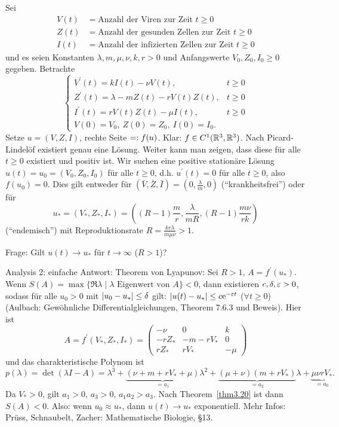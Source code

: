 \documentclass[a4paper,twoside,DIV15,BCOR12mm]{scrbook}
\begin{document}
\begin{bsp} \label{bsp3.21}
  Sei
  \begin{align*}
    V(t) &= \text{Anzahl der Viren zur Zeit } t\ge0\\
    Z(t) &= \text{Anzahl der gesunden Zellen zur Zeit } t\ge0\\
    I(t) &= \text{Anzahl der infizierten Zellen zur Zeit } t\ge0
  \end{align*}
  und es seien Konstanten $\lambda,m,\mu,\nu,k,r>0$ und Anfangswerte $V_0,Z_0,I_0\ge0$ gegeben. Betrachte
  \[ \begin{cases}
    V^\prime(t) = kI(t)-\nu V(t), &t\ge0\\
    Z^\prime(t) = \lambda - mZ(t) - rV(t)Z(t), &t\ge0\\
    I^\prime(t) = rV(t)Z(t) - \mu I(t), &t\ge0\\
    V(0)=V_0,\ Z(0)=Z_0,\ I(0)=I_0.
  \end{cases} \]
  Setze $u=(V,Z,I)$, rechte Seite $=: f(u)$. Klar: $f\in C^1(\mathbb{R}^3,\mathbb{R}^3)$. Nach Picard-Lindelöf existiert genau eine
  Lösung. Weiter kann man zeigen, dass diese für alle $t\ge0$ existiert und positiv ist. Wir suchen eine positive stationäre
  Lösung $u(t)=u_0=(V_0,Z_0,I_0)$ für alle $t\ge0$, d.h. $u^\prime(t)=0$ für alle $t\ge0$, also $f(u_0)=0$. Dies gilt entweder
  für $(\bar{V},\bar{Z},\bar{I})=(0,\frac{\lambda}{m},0)$ ("`krankheitsfrei"') oder für
  \[ u_* = (V_*,Z_*,I_*) = \left( (R-1)\frac{m}{r}, \frac{\lambda}{mR}, (R-1)\frac{m\nu}{rk} \right) \]
  ("`endemisch"') mit Reproduktionsrate $R=\frac{kr\lambda}{m\mu\nu}>1$.

  Frage: Gilt $u(t)\to u_*$ für $t\to\infty$ ($R>1$)?

  Analysis 2: einfache Antwort: Theorem von Lyapunov: Sei $R>1$, $A=f^\prime(u_*)$. Wenn
  $S(A)=\max{\{\Re{\lambda}\mid\lambda\text{ Eigenwert von } A\}}<0$, dann existieren $c,\delta,\varepsilon>0$, sodass für alle $u_0>0$
  mit $\left\lvert u_0-u_*\right\lvert\leq\delta$ gilt: $\left\lvert u(t)-u_*\right\lvert\leq c\mathrm{e}^{-\varepsilon t}$ ($\forall t\ge0$) (Aulbach: Gewöhnliche
  Differentialgleichungen, Theorem 7.6.3 und Beweis). Hier ist
  \[ A = f^\prime(V_*,Z_*,I_*) = \begin{pmatrix}-\nu&0&k\\-rZ_*&-m-rV_*&0\\rZ_*&rV_*&-\mu\end{pmatrix} \]
  und das charakteristische Polynom ist
  \[ p(\lambda) = \det{(\lambda I-A)} = \lambda^3 + \underbrace{(\nu+m+rV_*+\mu)}_{=a_1}\lambda^2 +
  \underbrace{(\mu+\nu)(m+rV_*)}_{=a_2}\lambda + \underbrace{\mu\nu rV_*}_{=a_0}. \]
  Da $V_*>0$, gilt $a_1>0$, $a_3>0$, $a_1a_2>a_3$. Nach Theorem~\ref{thm3.20} ist dann $S(A)<0$. Also: wenn $u_0\approx u_*$, dann
  $u(t)\to u_*$ exponentiell. Mehr Infos: Prüss, Schnaubelt, Zacher: Mathematische Biologie, §13.
\end{bsp}
\end{document}
